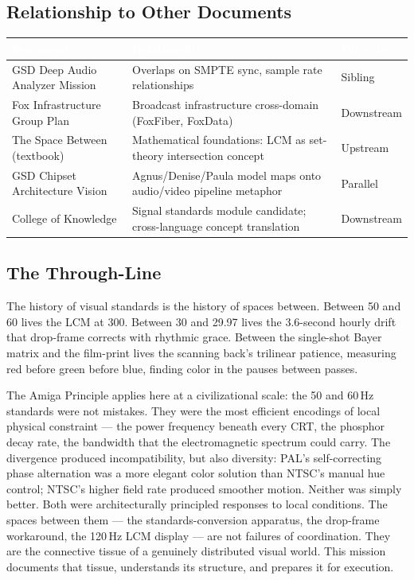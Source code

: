 \documentclass[11pt,letterpaper]{article}
\newcommand{\tableheader}[1]{\textbf{\sffamily\textcolor{white}{#1}}}
\begin{document}
\subsection{Relationship to Other Documents}

\begin{center}
\begin{tabularx}{\textwidth}{L{4cm}XC{2.5cm}}
\toprule
{}
\tableheader{Document} & \tableheader{Relationship} & \tableheader{Direction} \\
\midrule
GSD Deep Audio Analyzer Mission & Overlaps on SMPTE sync, sample rate relationships & Sibling \\
Fox Infrastructure Group Plan & Broadcast infrastructure cross-domain (FoxFiber, FoxData) & Downstream \\
The Space Between (textbook) & Mathematical foundations: LCM as set-theory intersection concept & Upstream \\
GSD Chipset Architecture Vision & Agnus/Denise/Paula model maps onto audio/video pipeline metaphor & Parallel \\
College of Knowledge & Signal standards module candidate; cross-language concept translation & Downstream \\
\bottomrule
\end{tabularx}
\end{center}

\subsection{The Through-Line}

The history of visual standards is the history of spaces between. Between 50 and 60 lives the
LCM at 300. Between 30 and 29.97 lives the 3.6-second hourly drift that drop-frame corrects with
rhythmic grace. Between the single-shot Bayer matrix and the film-print lives the scanning back's
trilinear patience, measuring red before green before blue, finding color in the pauses between passes.

The Amiga Principle applies here at a civilizational scale: the 50 and 60\,Hz standards were not
mistakes. They were the most efficient encodings of local physical constraint --- the power frequency
beneath every CRT, the phosphor decay rate, the bandwidth that the electromagnetic spectrum could carry.
The divergence produced incompatibility, but also diversity: PAL's self-correcting phase alternation
was a more elegant color solution than NTSC's manual hue control; NTSC's higher field rate produced
smoother motion. Neither was simply better. Both were architecturally principled responses to local
conditions. The spaces between them --- the standards-conversion apparatus, the drop-frame workaround,
the 120\,Hz LCM display --- are not failures of coordination. They are the connective tissue of a
genuinely distributed visual world. This mission documents that tissue, understands its structure,
and prepares it for execution.
\end{document}
